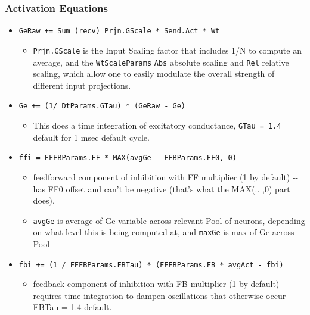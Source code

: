 \documentclass[11pt,twoside]{article}
\newif\myifpdf
\providecommand{\tightlist}{%
  \setlength{\itemsep}{.25in}\setlength{\parskip}{-.25in}}
\begin{document}
\subsubsection{Activation Equations}

\begin{itemize}
  \item \texttt{GeRaw\ +=\ Sum\_(recv)\ Prjn.GScale\ *\ Send.Act\ *\ Wt}
    \begin{itemize}
	\tightlist
    \item
      \texttt{Prjn.GScale} is the Input Scaling factor that
      includes 1/N to compute an average, and the \texttt{WtScaleParams}
      \texttt{Abs} absolute scaling and \texttt{Rel} relative scaling,
      which allow one to easily modulate the overall strength of
      different input projections.
    \end{itemize}
	
  \item \texttt{Ge\ +=\ (1/\ DtParams.GTau)\ *\ (GeRaw\ -\ Ge)}
    \begin{itemize}
	\tightlist
    \item
      This does a time integration of excitatory conductance,
      \texttt{GTau\ =\ 1.4} default for 1 msec default cycle.
    \end{itemize}
	
  \item \texttt{ffi\ =\ FFFBParams.FF\ *\ MAX(avgGe\ -\ FFBParams.FF0,\ 0)}

    \begin{itemize}
	\tightlist
    \item
      feedforward component of inhibition with FF multiplier (1 by
      default) -\/- has FF0 offset and can't be negative (that's what
      the MAX(.. ,0) part does).
    \item
      \texttt{avgGe} is average of Ge variable across relevant Pool of
      neurons, depending on what level this is being computed at, and
      \texttt{maxGe} is max of Ge across Pool
    \end{itemize}

  \item \texttt{fbi\ +=\ (1\ /\ FFFBParams.FBTau)\ *\ (FFFBParams.FB\ *\ avgAct\ -\ fbi)}

    \begin{itemize}
	\tightlist
    \item
      feedback component of inhibition with FB multiplier (1 by default)
      -\/- requires time integration to dampen oscillations that
      otherwise occur -\/- FBTau = 1.4 default.
    \end{itemize}
	

\end{itemize}
\end{document}
